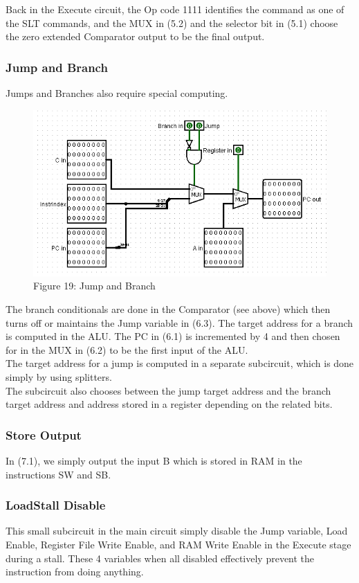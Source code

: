\documentclass{article}
\begin{document}
Back in the Execute circuit, the Op code 1111 identifies the command as one of the SLT commands, and the MUX in (5.2) and the selector bit in (5.1) choose the zero extended Comparator output to be the final output. 

\newpage
\subsubsection{Jump and Branch}
Jumps and Branches also require special computing. \\
\begin{figure}
\vspace{-1cm}
\begin{center}
\includegraphics[width=.6\textwidth]{Jump.png}\\
Figure 19: Jump and Branch
\end{center}
\vspace{-1cm}
\end{figure}
The branch conditionals are done in the Comparator (see above) which then turns off or maintains the Jump variable in (6.3). The target address for a branch is computed in the ALU. The PC in (6.1) is incremented by 4 and then chosen for in the MUX in (6.2) to be the first input of the ALU. \\
The target address for a jump is computed in a separate subcircuit, which is done simply by using splitters. \\
The subcircuit also chooses between the jump target address and the branch target address and address stored in a register depending on the related bits. 

\subsubsection{Store Output}
In (7.1), we simply output the input B which is stored in RAM in the instructions SW and SB.

\subsubsection{LoadStall Disable}
This small subcircuit in the main circuit simply disable the Jump variable, Load Enable, Register File Write Enable, and RAM Write Enable in the Execute stage during a stall. These 4 variables when all disabled effectively prevent the instruction from doing anything.
\end{document}
